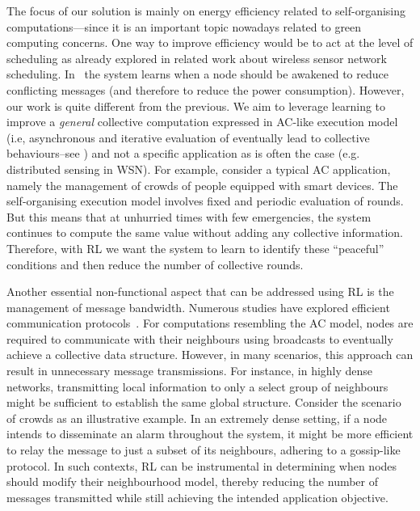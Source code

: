 {The focus of our solution is mainly on energy efficiency 
 related to self-organising computations---since it is an important topic nowadays related to green computing concerns.
One way to improve efficiency would be to act at the level of scheduling
 as already explored in related work about wireless sensor network scheduling.
 In~\cite{DBLP:journals/automatica/IwakiWWSJ21,DBLP:journals/ijcnds/MihaylovBTN12} the system learns 
 when a node should be awakened to reduce conflicting messages 
 (and therefore to reduce the power consumption). 
However, our work is quite different from the previous. 
 We aim to leverage learning to improve a \emph{general} collective computation 
 expressed in \ac{AC}-like execution model 
 (i.e, asynchronous and iterative evaluation of  eventually lead to collective behaviours--see )
 and not a specific application as is often the case (e.g. distributed sensing in WSN).
For example, consider a typical AC application, 
 namely the management of crowds of people equipped with smart devices. 
 The self-organising execution model involves fixed and periodic evaluation of rounds. 
 But this means that at unhurried times with few emergencies, 
 the system continues to compute the same value without adding any collective information. 
Therefore, with \ac{RL} we want the system to learn 
 to identify these ``peaceful'' conditions 
 and then reduce the number of collective rounds.

Another essential non-functional aspect that can be addressed using \ac{RL} is the management of message bandwidth. 
 Numerous studies have explored efficient communication protocols~\cite{DBLP:conf/nips/ZhangZL19, su2019cooperative}. 
 For computations resembling the AC model, nodes are required to communicate with their neighbours using broadcasts to eventually achieve a collective data structure. 
 However, in many scenarios, this approach can result in unnecessary message transmissions. 
 For instance, in highly dense networks, transmitting local information to only a select group of neighbours might be sufficient to establish the same global structure.
%
Consider the scenario of crowds as an illustrative example. 
 In an extremely dense setting, if a node intends to disseminate an alarm throughout the system, 
 it might be more efficient to relay the message to just a subset of its neighbours, 
 adhering to a gossip-like protocol.
In such contexts, \ac{RL} can be instrumental in determining 
 when nodes should modify their neighbourhood model, 
 thereby reducing the number of messages transmitted 
 while still achieving the intended application objective.
}

